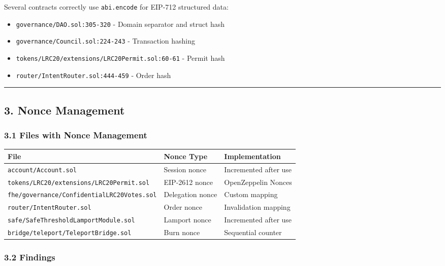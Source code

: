 \documentclass[
]{article}
\newcounter{none} %
\providecommand{\tightlist}{%
  \setlength{\itemsep}{0pt}\setlength{\parskip}{0pt}}
\begin{document}
Several contracts correctly use \texttt{abi.encode} for EIP-712
structured data:

\begin{itemize}
\tightlist
\item
  \texttt{governance/DAO.sol:305-320} - Domain separator and struct hash
\item
  \texttt{governance/Council.sol:224-243} - Transaction hashing
\item
  \texttt{tokens/LRC20/extensions/LRC20Permit.sol:60-61} - Permit hash
\item
  \texttt{router/IntentRouter.sol:444-459} - Order hash
\end{itemize}

\begin{center}\rule{0.5\linewidth}{0.5pt}\end{center}

\subsection{3. Nonce Management}\label{3-nonce-management}

\subsubsection{3.1 Files with Nonce
Management}\label{31-files-with-nonce-management}

{\def\LTcaptype{none} %
\begin{longtable}[]{@{}lll@{}}
\toprule\noalign{}
File & Nonce Type & Implementation \\
\midrule\noalign{}
\endhead
\bottomrule\noalign{}
\endlastfoot
\texttt{account/Account.sol} & Session nonce & Incremented after use \\
\texttt{tokens/LRC20/extensions/LRC20Permit.sol} & EIP-2612 nonce &
OpenZeppelin Nonces \\
\texttt{fhe/governance/ConfidentialLRC20Votes.sol} & Delegation nonce &
Custom mapping \\
\texttt{router/IntentRouter.sol} & Order nonce & Invalidation mapping \\
\texttt{safe/SafeThresholdLamportModule.sol} & Lamport nonce &
Incremented after use \\
\texttt{bridge/teleport/TeleportBridge.sol} & Burn nonce & Sequential
counter \\
\end{longtable}
}

\subsubsection{3.2 Findings}\label{32-findings}
\end{document}
